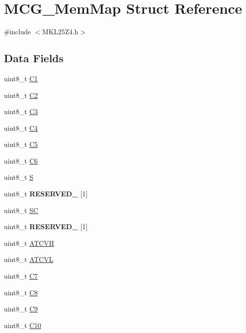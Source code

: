 \hypertarget{struct_m_c_g___mem_map}{}\section{M\+C\+G\+\_\+\+Mem\+Map Struct Reference}
\label{struct_m_c_g___mem_map}


{\ttfamily \#include $<$M\+K\+L25\+Z4.\+h$>$}

\subsection*{Data Fields}
\begin{DoxyCompactItemize}
\item 
uint8\+\_\+t \hyperlink{struct_m_c_g___mem_map_a8286c9d870f31a089d95e6a2285fbe2f}{C1}
\item 
uint8\+\_\+t \hyperlink{struct_m_c_g___mem_map_acdf8ac8ab339152eaed13f4eca300aa5}{C2}
\item 
uint8\+\_\+t \hyperlink{struct_m_c_g___mem_map_a328e95cb4deb2dd724cb8b26a5ab381b}{C3}
\item 
uint8\+\_\+t \hyperlink{struct_m_c_g___mem_map_a9ecb3242c606bc219190b4cb4f64600f}{C4}
\item 
uint8\+\_\+t \hyperlink{struct_m_c_g___mem_map_ac0242981a4c4bd9ccd00b67970943978}{C5}
\item 
uint8\+\_\+t \hyperlink{struct_m_c_g___mem_map_a64bf696a1420e91b19a0fc0b29311e5b}{C6}
\item 
uint8\+\_\+t \hyperlink{struct_m_c_g___mem_map_aef44b210af6af7cb40efdfd5469406c0}{S}
\item 
\hypertarget{struct_m_c_g___mem_map_a4be6979b69000068ac5203085d425825}{}uint8\+\_\+t {\bfseries R\+E\+S\+E\+R\+V\+E\+D\+\_} \mbox{[}1\mbox{]}\label{struct_m_c_g___mem_map_a4be6979b69000068ac5203085d425825}

\item 
uint8\+\_\+t \hyperlink{struct_m_c_g___mem_map_a994283cb179a11ded2d18c30c3710802}{S\+C}
\item 
\hypertarget{struct_m_c_g___mem_map_a83b2d6f5756a9b0aa609216190380d5f}{}uint8\+\_\+t {\bfseries R\+E\+S\+E\+R\+V\+E\+D\+\_} \mbox{[}1\mbox{]}\label{struct_m_c_g___mem_map_a83b2d6f5756a9b0aa609216190380d5f}

\item 
uint8\+\_\+t \hyperlink{struct_m_c_g___mem_map_a7ae9332fda80dd2a8e8f6bbe7402f04e}{A\+T\+C\+V\+H}
\item 
uint8\+\_\+t \hyperlink{struct_m_c_g___mem_map_ae14380e7296a15f9cad9168b69189eff}{A\+T\+C\+V\+L}
\item 
uint8\+\_\+t \hyperlink{struct_m_c_g___mem_map_af43b800cd7ef121b64ecb21279141911}{C7}
\item 
uint8\+\_\+t \hyperlink{struct_m_c_g___mem_map_a3b00df5dfe47159247af492db046dd07}{C8}
\item 
uint8\+\_\+t \hyperlink{struct_m_c_g___mem_map_afcf64e260d0ed62eb0141dee036d0dd3}{C9}
\item 
uint8\+\_\+t \hyperlink{struct_m_c_g___mem_map_aeaf517a97bec32fa35a10e97fdff08be}{C10}
\end{DoxyCompactItemize}


